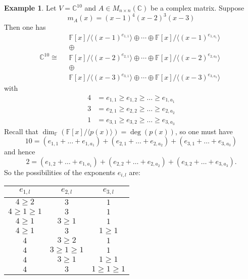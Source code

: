 \documentclass[11pt,openany]{book}
\theoremstyle{plain}
\theoremstyle{definition}
\newtheorem{example}[example]{Example}
\theoremstyle{remark}
\begin{document}
\begin{example}
    Let $V = \mathbb{C}^{10}$ and $A \in M_{n \times n}(\mathbb{C})$ be a complex matrix. Suppose
    $$m_{A}(x) = (x-1)^4(x-2)^3(x-3)$$
    Then one has 
    $$\mathbb{C}^{10} \cong \quad \begin{matrix} \mathbb{F}[x]/\langle (x-1)^{e_{1,1}} \rangle \oplus  \cdots \oplus \mathbb{F}[x]/\langle (x-1)^{e_{1,a_1}} \rangle \\
    \oplus \\ 
    \mathbb{F}[x]/\langle (x-2)^{e_{2,1}} \rangle \oplus \cdots \oplus \mathbb{F}[x]/\langle (x-2)^{e_{2,a_2}} \rangle\\ \oplus \\ 
    \mathbb{F}[x]/\langle (x-3)^{e_{3,1}} \rangle \oplus \cdots \oplus \mathbb{F}[x]/\langle (x-3)^{e_{3,a_3}}\rangle \end{matrix}$$
    with
    \begin{align*}
    4 &= e_{1,1} \geq e_{1,2} \geq \dots \geq e_{1,a_1}\\
    3 &= e_{2,1} \geq e_{2,2} \geq \dots \geq e_{2,a_2}\\
    1 &= e_{3,1} \geq e_{3,2} \geq \dots \geq e_{3,a_3}
    \end{align*}
    Recall that $\dim_{\mathbb{F}}(\mathbb{F}[x]/\langle p(x) \rangle) = \deg(p(x))$, so one must have
    $$10 = (e_{1,1} + \dots + e_{1,a_1})+ (e_{2,1} + \dots + e_{2,a_2}) + (e_{3,1} + \dots + e_{3,a_3})$$
    and hence
    $$2 = (e_{1,2} + \dots + e_{1,a_1})+ (e_{2,2} + \dots + e_{2,a_2}) + (e_{3,2} + \dots + e_{3,a_3}).$$
    So the possibilities of the exponents $e_{i,l}$ are:
    \begin{center}
    \begin{tabular}{|c|c|c|}
        \hline 
        $e_{1,l}$ &  $e_{2,l}$ & $e_{3,l}$\\
        \hline
         $4 \geq 2$ & $3$ & $1$\\
         \hline
         $4 \geq 1 \geq 1$ & $3$ & $1$\\
         \hline
         $4 \geq 1$ & $3 \geq 1$ & $1$\\
         \hline
         $4 \geq 1$ & $3$ & $1 \geq 1$\\
         \hline
         $4$ & $3 \geq 2$ & $1$\\
         \hline
         $4$ & $3 \geq 1 \geq 1$ & $1$\\
         \hline
         $4$ & $3 \geq 1$ & $1 \geq 1$\\
         \hline
         $4$ & $3$ & $1 \geq 1 \geq 1$\\
         \hline
    \end{tabular}    
    \end{center}


\end{example}
\end{document}
